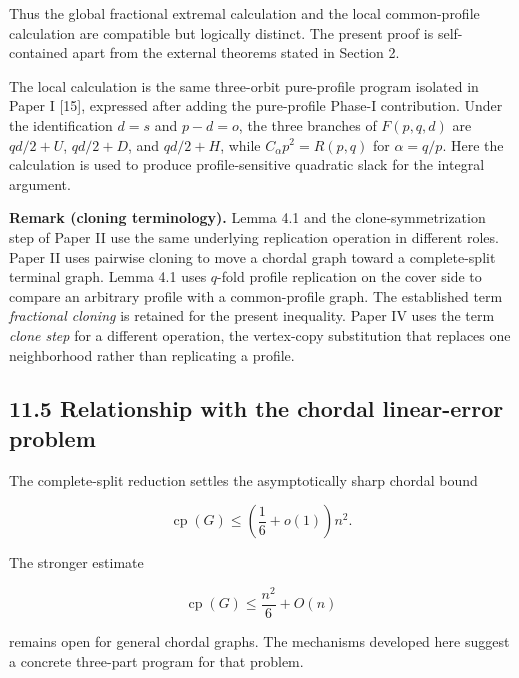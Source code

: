 \documentclass[
  american,
  11pt,
  a4paper,
]{article}
\begin{document}
Thus the global fractional extremal calculation and the local common-profile calculation are compatible but logically distinct. The present proof is self-contained apart from the external theorems stated in Section 2.

The local calculation is the same three-orbit pure-profile program isolated in Paper I {[}15{]}, expressed after adding the pure-profile Phase-I contribution. Under the identification \(d=s\) and \(p-d=o\), the three branches of \(F(p,q,d)\) are \(qd/2+U\), \(qd/2+D\), and \(qd/2+H\), while \(C_\alpha p^2=R(p,q)\) for \(\alpha=q/p\). Here the calculation is used to produce profile-sensitive quadratic slack for the integral argument.

\textbf{Remark (cloning terminology).} Lemma 4.1 and the clone-symmetrization step of Paper II use the same underlying replication operation in different roles. Paper II uses pairwise cloning to move a chordal graph toward a complete-split terminal graph. Lemma 4.1 uses \(q\)-fold profile replication on the cover side to compare an arbitrary profile with a common-profile graph. The established term \emph{fractional cloning} is retained for the present inequality. Paper IV uses the term \emph{clone step} for a different operation, the vertex-copy substitution that replaces one neighborhood rather than replicating a profile.

\subsection{11.5 Relationship with the chordal linear-error problem}\label{relationship-with-the-chordal-linear-error-problem}

The complete-split reduction settles the asymptotically sharp chordal bound

\[
\operatorname{cp}(G)
\le
\left(\frac16+o(1)\right)n^2.
\]

The stronger estimate

\[
\operatorname{cp}(G)
\le
\frac{n^2}{6}+O(n)
\]

remains open for general chordal graphs. The mechanisms developed here suggest a concrete three-part program for that problem.
\end{document}
